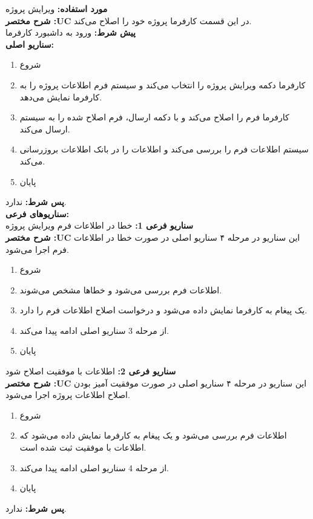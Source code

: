 \textbf{مورد استفاده:}
ویرایش پروژه
\\
\textbf{شرح مختصر :UC}
در این قسمت کارفرما پروژه خود را اصلاح می‌کند.
\\
\textbf{پيش شرط:}
ورود به داشبورد کارفرما
\\
\textbf{سناريو اصلی:}
\begin{enumerate}
\item
شروع
\item
کارفرما دکمه ویرایش پروژه را انتخاب می‌کند و سیستم فرم اطلاعات پروژه را به کارفرما نمایش می‌دهد.
\item
کارفرما فرم را اصلاح می‌کند و با دکمه ارسال، فرم اصلاح شده را به سیستم ارسال می‌کند.
\item
سیستم اطلاعات فرم را بررسی می‌کند و اطلاعات را در بانک اطلاعات بروزرسانی می‌کند.
\item
پایان
\end{enumerate}

\noindent
\textbf{پس شرط:}
ندارد.
\\
\textbf{سناريوهای فرعی:}
\\
\textbf{سناريو فرعی 1:}
خطا در اطلاعات فرم ویرایش پروژه
\\
\textbf{شرح مختصر :UC}
این سناریو در مرحله ۴ سناریو اصلی در صورت خطا در اطلاعات فرم اجرا می‌شود.
\begin{enumerate}
\item
شروع
\item
اطلاعات فرم بررسی می‌شود و خطاها مشخص می‌شوند.
\item
یک پیغام به کارفرما نمایش داده می‌شود و درخواست اصلاح اطلاعات فرم را دارد.
\item
از مرحله 3 سناریو اصلی ادامه پیدا می‌کند.
\item
پایان
\end{enumerate}

\noindent
\textbf{سناريو فرعی 2:}
اطلاعات با موفقیت اصلاح شود
\\
\textbf{شرح مختصر :UC}
این سناریو در مرحله ۴ سناریو اصلی در صورت موفقیت آمیز بودن اصلاح اطلاعات پروژه اجرا می‌شود.
\begin{enumerate}
\item
شروع
\item
اطلاعات فرم بررسی می‌شود و یک پیغام به کارفرما نمایش داده می‌شود که اطلاعات با موفقیت ثبت شده است.
\item
از مرحله 4 سناریو اصلی ادامه پیدا می‌کند.
\item
پایان
\end{enumerate}

\noindent
\textbf{پس شرط:}
ندارد.



